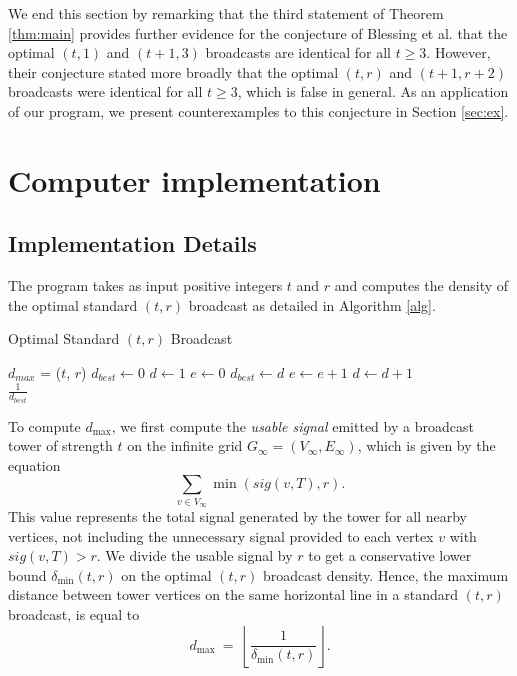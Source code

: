 \documentclass[12pt]{amsart}
\newcounter{x}
\newcounter{y}
\newcounter{x2}
\newcounter{y2}
\begin{document}
We end this section by remarking that the third statement of Theorem \ref{thm:main} provides further evidence for the conjecture of Blessing et al. that the optimal $(t,1)$ and $(t+1,3)$ broadcasts are identical for all $t\geq 3$. However, their conjecture stated more broadly that the optimal $(t,r)$ and $(t+1,r+2)$ broadcasts were identical for all $t\geq 3$, which is false in general. As an application of our program, we present counterexamples to this conjecture in Section \ref{sec:ex}.





\section{Computer implementation}\label{comp}

\subsection{Implementation Details}


The program takes as input positive integers $t$ and $r$ and computes the density of the optimal standard $(t,r)$ broadcast as detailed in Algorithm \ref{alg}.

\begin{algorithm}
    \caption{Optimal Standard $(t,r)$ Broadcast}
    \label{alg}
    \begin{algorithmic}[1]
        \State $d_{max}$ = ($t$, $r$)
        \State $d_{best} \gets 0$
        \State $d \gets 1$
            \State $e \gets 0$
                    \State $d_{best} \gets d$
                \EndIf
                \State $e \gets e+1$
            \EndWhile
            \State $d \gets d+1$
        \EndWhile \\
        \Return $\frac{1}{d_{best}}$
    \EndProcedure
    \end{algorithmic}
\end{algorithm}

To compute $d_{\max}$, we first compute the \emph{usable signal} emitted by a broadcast tower of strength $t$ on the infinite grid $G_\infty = (V_\infty, E_\infty)$, which is given by the equation
\[\sum_{v \in V_\infty}\min(sig(v,T), r).\]
This value represents the total signal generated by the tower for all nearby vertices, not including the unnecessary signal provided to each vertex $v$ with $sig(v,T) > r$. We divide the usable signal by $r$ to get a conservative lower bound $\delta_{\min}(t,r)$ on the optimal $(t,r)$ broadcast density. Hence, the maximum distance between tower vertices on the same horizontal line in a standard $(t,r)$ broadcast, is equal to
\[d_{\max} \ = \ \left\lfloor \frac{1}{\delta_{\min}(t,r)} \right\rfloor. \]
\end{document}
